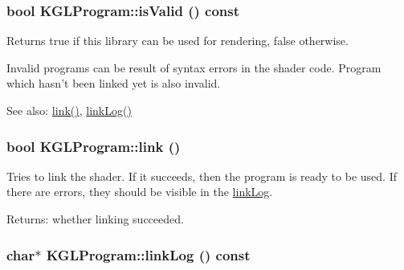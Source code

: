 \hypertarget{class_k_g_l_program_5c1aeee12f117bcdb9617ef27c223918}{
\subsubsection[{isValid}]{\setlength{\rightskip}{0pt plus 5cm}bool KGLProgram::isValid () const}}
\label{class_k_g_l_program_5c1aeee12f117bcdb9617ef27c223918}


Returns true if this library can be used for rendering, false otherwise.

Invalid programs can be result of syntax errors in the shader code. Program which hasn't been linked yet is also invalid.

\begin{Desc}
\item[See also:]\hyperlink{class_k_g_l_program_906166edf1fc7332a5ff8d6c1c18469c}{link()}, \hyperlink{class_k_g_l_program_731506a0e8462aa48f576ab4c1d28fc9}{linkLog()} \end{Desc}
\hypertarget{class_k_g_l_program_906166edf1fc7332a5ff8d6c1c18469c}{
\subsubsection[{link}]{\setlength{\rightskip}{0pt plus 5cm}bool KGLProgram::link ()}}
\label{class_k_g_l_program_906166edf1fc7332a5ff8d6c1c18469c}


Tries to link the shader. If it succeeds, then the program is ready to be used. If there are errors, they should be visible in the \hyperlink{class_k_g_l_program_731506a0e8462aa48f576ab4c1d28fc9}{linkLog}. \begin{Desc}
\item[Returns:]whether linking succeeded. \end{Desc}
\hypertarget{class_k_g_l_program_731506a0e8462aa48f576ab4c1d28fc9}{
\subsubsection[{linkLog}]{\setlength{\rightskip}{0pt plus 5cm}char$\ast$ KGLProgram::linkLog () const}}
\label{class_k_g_l_program_731506a0e8462aa48f576ab4c1d28fc9}


